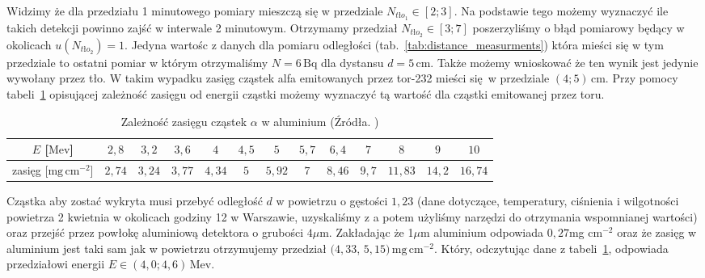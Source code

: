 \documentclass[12pt]{article}
\begin{document}
Widzimy że dla przedziału 1 minutowego pomiary mieszczą się w przedziale \(N_{tło_1} \in [2; 3]\). Na podstawie tego możemy wyznaczyć ile takich detekcji powinno zajść w interwale 2 minutowym.
Otrzymamy przedział \(N_{tło_2} \in [3;7]\) poszerzyliśmy o błąd pomiarowy będący w okolicach \(u(N_{tło_2}) = 1\).
Jedyna wartośc z danych dla pomiaru odległości (tab.~\ref{tab:distance_measurments}) która mieści się w tym przedziale to ostatni pomiar w którym otrzymaliśmy \(N = 6 \, \mathrm{Bq}\) dla dystansu \(d = 5 \, \mathrm{cm}\).
Także możemy wnioskować że ten wynik jest jedynie wywołany przez tło. W takim wypadku zasięg cząstek alfa emitowanych przez tor-232 mieści się w przedziale \((4; 5) \, \mathrm{cm}\). Przy pomocy tabeli~\ref{tab:energy_range} opisującej zależność zasięgu od energii cząstki możemy wyznaczyć tą wartość dla cząstki emitowanej przez toru.
\begin{table}[H]
	\centering
	\begin{tabular}{|c|c|c|c|c|c|c|c|c|c|c|c|c|}
		\midrule
		\(E\) [\(\mathrm{Mev}\)]            & \(2{,}8\)  & \(3{,}2\)  & \(3{,}6\)  & \(4\)      & \(4{,}5\) & \(5\)      & \(5{,}7\) & \(6{,}4\)  & \(7\)     & \(8\)       & \(9\)      & \(10\)      \\
		\midrule
		zasięg [\(\mathrm{mg \, cm}^{-2}\)] & \(2{,}74\) & \(3{,}24\) & \(3{,}77\) & \(4{,}34\) & \(5\)     & \(5{,}92\) & \(7\)     & \(8{,}46\) & \(9{,}7\) & \(11{,}83\) & \(14{,}2\) & \(16{,}74\) \\
		\bottomrule
	\end{tabular}
	\caption{Zależność zasięgu cząstek \(\alpha\) w aluminium (Źródła. \cite{skrypt}\cite{alpha_max_range})}
	\label{tab:energy_range}
\end{table}

Cząstka aby zostać wykryta musi przebyć odległość \(d\) w powietrzu o gęstości \(1{,}23\) (dane dotyczące, temperatury, ciśnienia i wilgotności powietrza 2 kwietnia w okolicach godziny 12 w Warszawie, uzyskaliśmy z \cite{temp} a potem użyliśmy narzędzi \cite{density}\cite{dew} do otrzymania wspomnianej wartości) oraz przejść przez powłokę aluminiową detektora o grubości \(4\mu \)m. Zakładając że 1\(\mu\)m aluminium odpowiada \(0{,}27\)mg cm\(^{-2}\) oraz że zasięg w aluminium jest taki sam jak w powietrzu otrzymujemy przedział \((4{,}33\), \(5{,}15) \, \mathrm{mg \, cm^{-2}}\). Który, odczytując dane z tabeli~\ref{tab:energy_range}, odpowiada przedziałowi energii \(E \in (4{,}0; 4{,}6) \, \mathrm{Mev}\).
\end{document}
